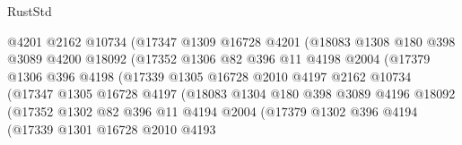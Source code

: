 \begin{lexlean}{RustStd}
\begin{coremodule}
                            @4201
                            @2162
                            @10734
                            (@17347
                              @1309
                              @16728
                              @4201
                              (@18083
                                @1308
                                @180
                                @398
                                @3089
                                @4200
                                @18092
                                (@17352
                                  @1306
                                  @82
                                  @396
                                  @11
                                  @4198
                                  @2004
                                  (@17379
                                    @1306
                                    @396
                                    @4198
                                    (@17339
                                      @1305
                                      @16728
                                      @2010
                                      @4197
                                      @2162
                                      @10734
                                      (@17347
                                        @1305
                                        @16728
                                        @4197
                                        (@18083
                                          @1304
                                          @180
                                          @398
                                          @3089
                                          @4196
                                          @18092
                                          (@17352
                                            @1302
                                            @82
                                            @396
                                            @11
                                            @4194
                                            @2004
                                            (@17379
                                              @1302
                                              @396
                                              @4194
                                              (@17339
                                                @1301
                                                @16728
                                                @2010
                                                @4193

\end{coremodule}
\end{lexlean}
